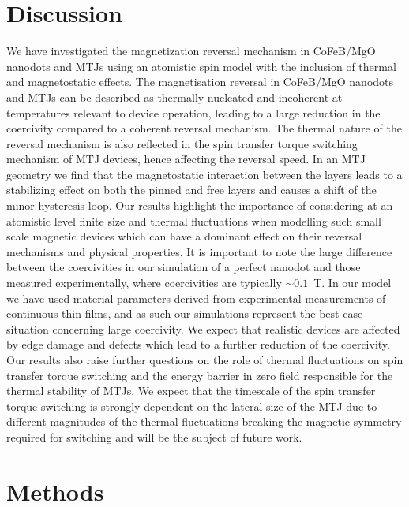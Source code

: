 \documentclass[aps,prb,signlecolumn,preprint,superscriptaddress,10]{revtex4-1}
\begin{document}
\section*{Discussion}
We have investigated the magnetization reversal mechanism in CoFeB/MgO nanodots and MTJs using an atomistic spin model with the inclusion of thermal and magnetostatic effects.
The magnetisation reversal in CoFeB/MgO nanodots and MTJs can be described as thermally nucleated and incoherent at temperatures relevant to device operation, leading to a large reduction in the coercivity compared to a coherent reversal mechanism. The thermal nature of the reversal mechanism is also reflected in  the spin transfer torque switching mechanism of MTJ devices, hence affecting the reversal speed. In an MTJ geometry we find that the magnetostatic interaction between the layers leads to a stabilizing effect on both the pinned and free layers and causes a shift of the minor hysteresis loop.  
Our results highlight the importance of considering at an atomistic level finite size and thermal fluctuations when modelling such small scale magnetic devices which can have a dominant effect on their reversal mechanisms and physical properties. It is important to note the large difference between the coercivities in our simulation of a perfect nanodot and those measured experimentally, where coercivities are typically $\sim 0.1$~T. In our model we have used material parameters derived from experimental measurements of continuous thin films, and as such our simulations represent the best case situation concerning large coercivity. We expect that realistic devices are affected by edge damage and defects which lead to a further reduction of the coercivity. Our results also raise further questions on the role of thermal fluctuations on spin transfer torque switching and the energy barrier in zero field responsible for the thermal stability of MTJs. We expect that the timescale of the spin transfer torque switching is strongly dependent on the lateral size of the MTJ due to different magnitudes of the thermal fluctuations breaking the magnetic symmetry required for switching and will be the subject of future work.

\section*{Methods}
\end{document}
